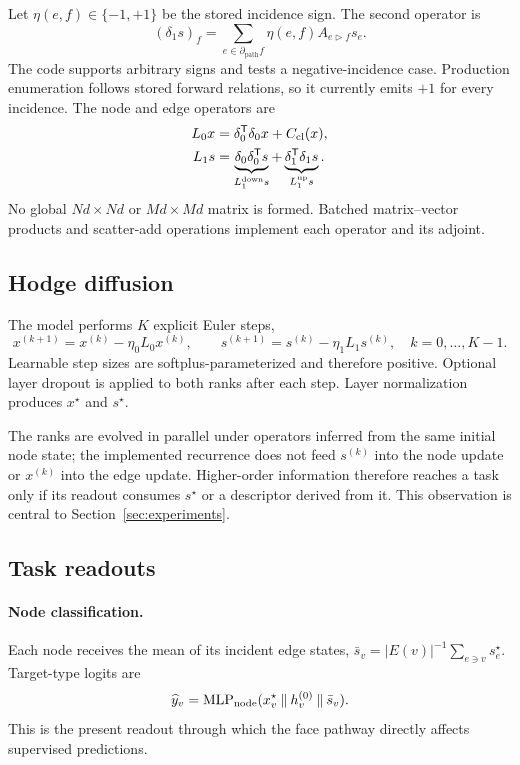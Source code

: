 Let $\eta(e,f)\in\{-1,+1\}$ be the stored incidence sign. The second operator is
\begin{equation}
  (\delta_1s)_f=\sum_{e\in\partial_{\mathrm{path}} f}
  \eta(e,f)A_{e\triangleright f}s_e.
  \label{eq:delta1}
\end{equation}
The code supports arbitrary signs and tests a negative-incidence case. Production enumeration
follows stored forward relations, so it currently emits $+1$ for every incidence. The node and
edge operators are
\begin{align}
  L_0x &= \delta_0^{\mathsf{T}}\delta_0x+C_{\mathrm{cl}}(x),
  \label{eq:l0}\\
  L_1s &= \underbrace{\delta_0\delta_0^{\mathsf{T}}s}_{L_1^{\mathrm{down}}s}
         +\underbrace{\delta_1^{\mathsf{T}}\delta_1s}_{L_1^{\mathrm{up}}s}.
  \label{eq:l1}
\end{align}
No global $Nd\times Nd$ or $Md\times Md$ matrix is formed. Batched matrix--vector products and
scatter-add operations implement each operator and its adjoint.

\subsection{Hodge diffusion}

The model performs $K$ explicit Euler steps,
\begin{equation}
  x^{(k+1)}=x^{(k)}-\eta_0L_0x^{(k)},\qquad
  s^{(k+1)}=s^{(k)}-\eta_1L_1s^{(k)},\quad k=0,\ldots,K-1.
  \label{eq:diffusion}
\end{equation}
Learnable step sizes are softplus-parameterized and therefore positive. Optional layer dropout is
applied to both ranks after each step. Layer normalization produces $x^\star$ and $s^\star$.

The ranks are evolved in parallel under operators inferred from the same initial node state; the
implemented recurrence does not feed $s^{(k)}$ into the node update or $x^{(k)}$ into the edge
update. Higher-order information therefore reaches a task only if its readout consumes $s^\star$
or a descriptor derived from it. This observation is central to Section~\ref{sec:experiments}.

\subsection{Task readouts}
\label{sec:readouts}

\paragraph{Node classification.}
Each node receives the mean of its incident edge states,
$\bar{s}_v=|E(v)|^{-1}\sum_{e\ni v}s_e^\star$. Target-type logits are
\begin{equation}
  \widehat{y}_v=\operatorname{MLP}_{\mathrm{node}}
  (x_v^\star\mathbin\Vert h_v^{(0)}\mathbin\Vert\bar{s}_v).
  \label{eq:node-readout}
\end{equation}
This is the present readout through which the face pathway directly affects supervised predictions.

